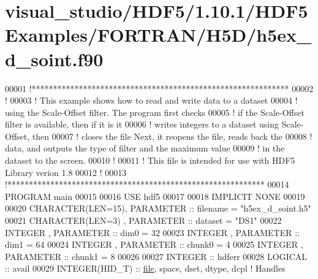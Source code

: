 \hypertarget{visual__studio_2_h_d_f5_21_810_81_2_h_d_f5_examples_2_f_o_r_t_r_a_n_2_h5_d_2h5ex__d__soint_8f90_source}{}\section{visual\+\_\+studio/\+H\+D\+F5/1.10.1/\+H\+D\+F5\+Examples/\+F\+O\+R\+T\+R\+A\+N/\+H5\+D/h5ex\+\_\+d\+\_\+soint.f90}
\label{visual__studio_2_h_d_f5_21_810_81_2_h_d_f5_examples_2_f_o_r_t_r_a_n_2_h5_d_2h5ex__d__soint_8f90_source}

\begin{DoxyCode}
00001 \textcolor{comment}{!************************************************************}
00002 \textcolor{comment}{!}
00003 \textcolor{comment}{!  This example shows how to read and write data to a dataset}
00004 \textcolor{comment}{!  using the Scale-Offset filter.  The program first checks}
00005 \textcolor{comment}{!  if the Scale-Offset filter is available, then if it is it}
00006 \textcolor{comment}{!  writes integers to a dataset using Scale-Offset, then}
00007 \textcolor{comment}{!  closes the file Next, it reopens the file, reads back the}
00008 \textcolor{comment}{!  data, and outputs the type of filter and the maximum value}
00009 \textcolor{comment}{!  in the dataset to the screen.}
00010 \textcolor{comment}{!}
00011 \textcolor{comment}{!  This file is intended for use with HDF5 Library verion 1.8}
00012 \textcolor{comment}{!}
00013 \textcolor{comment}{!************************************************************}
00014 \textcolor{keyword}{PROGRAM} main
00015 
00016   \textcolor{keywordtype}{USE }hdf5
00017 
00018   \textcolor{keywordtype}{IMPLICIT NONE}
00019 
00020   \textcolor{keywordtype}{CHARACTER(LEN=15)}, \textcolor{keywordtype}{PARAMETER} :: filename = \textcolor{stringliteral}{"h5ex\_d\_soint.h5"}
00021   \textcolor{keywordtype}{CHARACTER(LEN=3)} , \textcolor{keywordtype}{PARAMETER} :: dataset  = \textcolor{stringliteral}{"DS1"}
00022   \textcolor{keywordtype}{INTEGER}          , \textcolor{keywordtype}{PARAMETER} :: dim0     = 32
00023   \textcolor{keywordtype}{INTEGER}          , \textcolor{keywordtype}{PARAMETER} :: dim1     = 64
00024   \textcolor{keywordtype}{INTEGER}          , \textcolor{keywordtype}{PARAMETER} :: chunk0   = 4
00025   \textcolor{keywordtype}{INTEGER}          , \textcolor{keywordtype}{PARAMETER} :: chunk1   = 8
00026 
00027   \textcolor{keywordtype}{INTEGER} :: hdferr
00028   \textcolor{keywordtype}{LOGICAL} :: avail
00029   \textcolor{keywordtype}{INTEGER(HID\_T)}  :: \hyperlink{structfile}{file}, space, dset, dtype, dcpl \textcolor{comment}{! Handles}

\end{DoxyCode}
